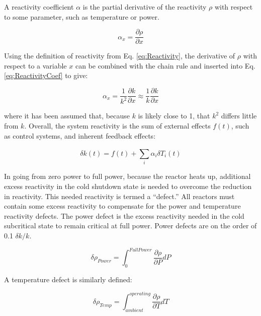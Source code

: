 \documentclass[10pt]{article}
\begin{document}
\begin{flushleft}
A reactivity coefficient \(\alpha\) is the partial derivative of the reactivity \(\rho\) with respect to some parameter, such as temperature or power.

\begin{equation}
\label{eq:ReactivityCoef}
\alpha_x = \frac{\partial\rho}{\partial x}
\end{equation}

Using the definition of reactivity from Eq. \ref{eq:Reactivity}, the derivative of \(\rho\) with respect to a variable \(x\) can be combined with the chain rule and inserted into Eq. \ref{eq:ReactivityCoef} to give:

\begin{equation}
\label{eq:ReactivityCoef_kExpansion}
\alpha_x = \frac{1}{k^2}\frac{\partial k}{\partial x} \approx \frac{1}{k}\frac{\partial k}{\partial x}
\end{equation}

where it has been assumed that, because \(k\) is likely close to 1, that \(k^2\) differs little from \(k\). Overall, the system reactivity is the sum of external effects \(f(t)\), such as control systems, and inherent feedback effects:

\begin{equation}
\label{eq:OverallReactivity}
\delta k(t) = f(t) + \sum_{i}^{}\alpha_i\delta T_i(t)
\end{equation}

In going from zero power to full power, because the reactor heats up, additional excess reactivity in the cold shutdown state is needed to overcome the reduction in reactivity. This needed reactivity is termed a ``defect.'' All reactors must contain some excess reactivity to compensate for the power and temperature reactivity defects. The power defect is the excess reactivity needed in the cold subcritical state to remain critical at full power. Power defects are on the order of 0.1 \(\delta k/k\). 

\begin{equation}
\label{eq:PowerDefect}
\delta\rho_{Power}=\int_{0}^{Full Power} \frac{\partial\rho}{\partial P}dP
\end{equation}

A temperature defect is similarly defined:

\begin{equation}
\label{eq:TemperatureDefect}
\delta\rho_{Temp}=\int_{ambient}^{operating} \frac{\partial\rho}{\partial T}dT
\end{equation}


\end{flushleft}
\end{document}
